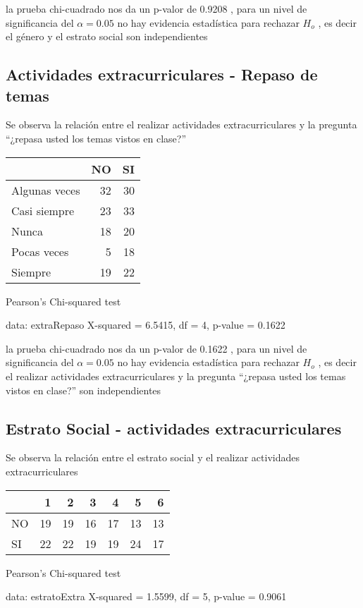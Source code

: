 \documentclass[
  man]{apa6}
\begin{document}
la prueba chi-cuadrado nos da un p-valor de 0.9208 , para un nivel de
significancia del \(\alpha =0.05\) no hay evidencia estadística para
rechazar \(H_o\) , es decir el género y el estrato social son
independientes

\hypertarget{actividades-extracurriculares---repaso-de-temas}{%
\subsection{Actividades extracurriculares - Repaso de temas}\label{actividades-extracurriculares---repaso-de-temas}}

Se observa la relación entre el realizar actividades extracurriculares y
la pregunta ``¿repasa usted los temas vistos en clase?''

\begin{center}


\begin{tabular}{l|r|r}
\hline
  & NO & SI\\
\hline
Algunas veces & 32 & 30\\
\hline
Casi siempre & 23 & 33\\
\hline
Nunca & 18 & 20\\
\hline
Pocas veces & 5 & 18\\
\hline
Siempre & 19 & 22\\
\hline
\end{tabular}


    Pearson's Chi-squared test

data:  extraRepaso
X-squared = 6.5415, df = 4, p-value = 0.1622
\end{center}

la prueba chi-cuadrado nos da un p-valor de 0.1622 , para un nivel de
significancia del \(\alpha =0.05\) no hay evidencia estadística para
rechazar \(H_o\) , es decir el realizar actividades extracurriculares y la
pregunta ``¿repasa usted los temas vistos en clase?'' son independientes

\hypertarget{estrato-social---actividades-extracurriculares}{%
\subsection{Estrato Social - actividades extracurriculares}\label{estrato-social---actividades-extracurriculares}}

Se observa la relación entre el estrato social y el realizar actividades
extracurriculares

\begin{center}


\begin{tabular}{l|r|r|r|r|r|r}
\hline
  & 1 & 2 & 3 & 4 & 5 & 6\\
\hline
NO & 19 & 19 & 16 & 17 & 13 & 13\\
\hline
SI & 22 & 22 & 19 & 19 & 24 & 17\\
\hline
\end{tabular}


    Pearson's Chi-squared test

data:  estratoExtra
X-squared = 1.5599, df = 5, p-value = 0.9061
\end{center}
\end{document}
